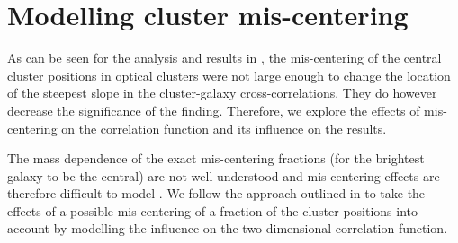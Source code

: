 \documentclass[iop, apjl, twocolappendix, numberedappendix]{emulateapj}
\begin{document}
\section{Modelling cluster mis-centering}
\label{sec:mis-centering}
As can be seen for the analysis and results in \citet{baxter2017halo},
the mis-centering of the central cluster positions in optical clusters
were not large enough to change the location of the steepest slope in
the cluster-galaxy cross-correlations. They do however decrease the
significance of the finding. Therefore, we explore the effects of
mis-centering on the correlation function and its influence on the
results. 

The mass dependence of the exact mis-centering fractions (for the
brightest galaxy to be the central) are not well understood and
mis-centering effects are therefore difficult to model
\citep{Skibba:2011, Hoshino:2015}. We follow the approach outlined in
\citet{baxter2017halo} to take the effects of a possible mis-centering
of a fraction of the cluster positions into account by modelling the
influence on the two-dimensional correlation function.
\end{document}
